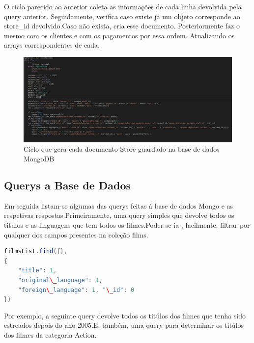 O ciclo parecido ao anterior coleta as informações de cada linha devolvida pela query anterior. Seguidamente, verifica caso existe já um objeto corresponde ao store\_id devolvido.Caso não exista, cria esse documento. Posteriormente faz o mesmo com os clientes e com os pagamentos por essa ordem. Atualizando os arrays correspondentes de cada.

\begin{figure}[H]

  \centering

  \includegraphics[width=\textwidth]{PovoamentoMongo2.png}

  \caption {Ciclo que gera cada documento Store guardado na base de dados MongoDB}

  \label {fig:Mongo2}

\end{figure}



\subsection{Querys a Base de Dados}

Em seguida listam-se algumas das querys feitas á base de dados Mongo e as respetivas respostas.Primeiramente, uma query simples que devolve todos os titulos e as linguagens que tem todos os filmes.Poder-se-ia , facilmente, filtrar por qualquer dos campos presentes na coleção films.

\begin{lstlisting}[language=java,caption=Query ao Mongo para devolver todos os Filmes]
filmsList.find({},
{
	"title": 1, 
	"original\_language": 1, 
	"foreign\_language": 1, "\_id": 0
})
\end{lstlisting}

Por exemplo, a seguinte query devolve todos os titúlos dos filmes que tenha sido estreados depois do ano 2005.E, também, uma query para determinar os titúlos dos filmes da categoria Action.

